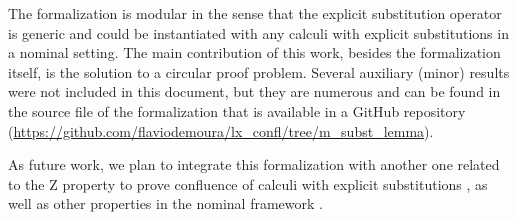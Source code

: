 The formalization is modular in the sense that the explicit substitution operator is generic and could be instantiated with any calculi with  explicit substitutions in a nominal setting. The main contribution of this work, besides the formalization itself, is the solution to a circular proof problem. Several auxiliary (minor) results were not included in this document, but they are numerous and can be found in the source file of the formalization that is available in a GitHub repository (\url{https://github.com/flaviodemoura/lx_confl/tree/m_subst_lemma}).


As future work, we plan to integrate this formalization with another one related to the Z property \cite{fmm2021} to prove confluence  of calculi with explicit substitutions \cite{nakazawaCompositionalConfluenceProofs2016,nakazawaCallbyvalue2017}, as well as  other properties in the nominal framework \cite{kesnerPerpetualityFullSafe2008}. 
\begin{coqdoccode}
\end{coqdoccode}
